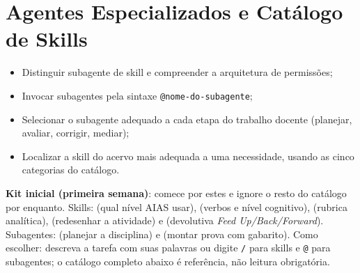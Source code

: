 \chapter{Agentes Especializados e Cat{\'a}logo de Skills}
\label{cap:agentes-skills}

\begin{objetivos}
\begin{itemize}
  \item Distinguir subagente de skill e compreender a arquitetura de permiss{\~o}es;
  \item Invocar subagentes pela sintaxe \texttt{@nome-do-subagente};
  \item Selecionar o subagente adequado a cada etapa do trabalho docente (planejar, avaliar, corrigir, mediar);
  \item Localizar a skill do acervo mais adequada a uma necessidade, usando as cinco categorias do cat{\'a}logo.
\end{itemize}
\end{objetivos}

\begin{dicaopencode}
\textbf{Kit inicial (primeira semana)}: comece por estes e ignore o resto do cat{\'a}logo por enquanto. Skills:  (qual n{\'i}vel AIAS usar),  (verbos e n{\'i}vel cognitivo),  (rubrica anal{\'i}tica),  (redesenhar a atividade) e  (devolutiva \emph{Feed Up/Back/Forward}). Subagentes:  (planejar a disciplina) e  (montar prova com gabarito). Como escolher: descreva a tarefa com suas palavras ou digite \texttt{/} para skills e \texttt{@} para subagentes; o cat{\'a}logo completo abaixo {\'e} refer{\^e}ncia, n{\~a}o leitura obrigat{\'o}ria.
\end{dicaopencode}

